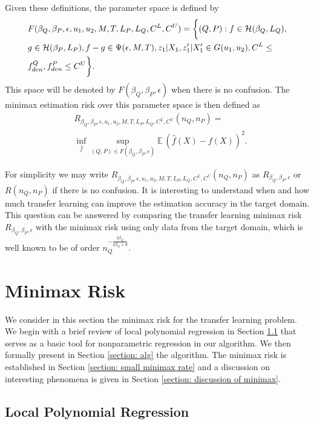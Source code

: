 \documentclass{article}
\def\E{\mathbb{E}}
\def\H{\mathcal{H}}
\begin{document}
Given these definitions, the parameter space is defined by 
\begin{align}
&F(\beta_Q,\beta_P,\epsilon,u_1,u_2,M,T,{L_P},L_Q,C^L,C^U)=\bigg\{(Q,P):f\in \H(\beta_Q,L_Q),\notag\\
&g\in \H(\beta_{P},L_{P}), f-g\in\Psi(\epsilon,M,T),z_1 |X_1,z_{1}' |X_1'\in G(u_1,u_2),C^{L}\leq\\
&f_{den}^Q,f_{den}^P\leq C^U\bigg\}\label{eqn: F set}.
\end{align}
This space will be denoted by $F(\beta_Q,\beta_P,\epsilon)$ when there is no confusion. 
The minimax estimation risk over this parameter space is then defined as
\begin{align*}
&R_{\beta_Q,\beta_P,\epsilon,u_1,u_2,M,T,L_P,L_Q,C^L,C^U}(n_Q,n_{P})=\\
&\inf_{\hat f} \sup_{(Q,P)\in F(\beta_Q,\beta_P,\epsilon)} \E \ (\hat f(X)-f(X))^2. 
\end{align*}

For simplicity we may write  $R_{\beta_Q,\beta_P,\epsilon,u_1,u_2,M,T,L_P,L_Q,C^L,C^U}(n_Q,n_{P})$ as $R_{\beta_Q,\beta_P,\epsilon}$ or $R(n_Q,n_P)$ if there is no confusion. It is interesting to understand when and how much transfer learning can improve the estimation accuracy in the target domain. This question can be answered by comparing the transfer learning minimax risk $R_{\beta_Q,\beta_P,\epsilon}$ with the 
minimax risk using only data from the target domain, which is well known to be of order $n_Q^{-\frac{2\beta_Q}{2\beta_Q+d}}$.


\section{Minimax Risk}
\label{section: minimax risk}

We consider in this section the minimax risk for the transfer learning problem.  We begin with a brief review of local polynomial regression  in Section \ref{section: lpr} that serves as a basic tool for nonparametric regression in our algorithm. We then formally present in Section \ref{section: alg} the algorithm. The minimax risk is established in Section \ref{section: small minimax rate}  and a discussion on interesting phenomena is given in Section \ref{section: discussion of minimax}.

\subsection{Local Polynomial Regression}
\label{section: lpr}
\end{document}
